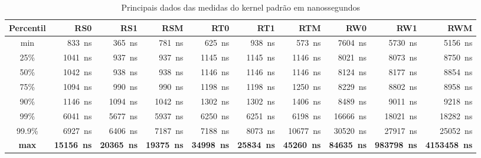 \begin{table}[!htb]
\tiny
\centering
\begin{center}
\begin{tabular}{|c|r|r|r|r|r|r|r|r|r|}
\toprule
Percentil &    RS0 &     RS1 &    RSM &    RT0 &    RT1 &    RTM &    RW0 &     RW1 &      RWM \\
\midrule
    min &    \SI{833}{ns} &    \SI{365} {ns} &   \SI{ 781}{ns} &   \SI{ 625}{ns} &   \SI{ 938}{ns} &  \SI{  573} {ns}&  \SI{ 7604} {ns}&   \SI{ 5730} {ns}&    \SI{ 5156} {ns}\\
    25\% &   \SI{1041}{ns} &   \SI{937} {ns} &   \SI{ 937}{ns} &   \SI{1145}{ns} &   \SI{1145}{ns} &  \SI{ 1146} {ns}&  \SI{ 8021} {ns}&   \SI{ 8073} {ns}&    \SI{ 8750} {ns}\\
    50\% &   \SI{1042}{ns} &   \SI{938} {ns} &   \SI{ 938}{ns} &   \SI{1146}{ns} &   \SI{1146}{ns} &  \SI{ 1146} {ns}&  \SI{ 8124} {ns}&   \SI{ 8177} {ns}&    \SI{ 8854} {ns}\\
    75\% &   \SI{1094}{ns} &   \SI{990} {ns} &   \SI{ 990}{ns} &   \SI{1198}{ns} &   \SI{1198}{ns} &  \SI{ 1250} {ns}&  \SI{ 8229} {ns}&   \SI{ 8802} {ns}&    \SI{ 8958} {ns}\\
    90\% &   \SI{1146}{ns} &   \SI{1094}{ns} &   \SI{1042}{ns} &   \SI{1302}{ns} &   \SI{1302}{ns} &  \SI{ 1406} {ns}&  \SI{ 8489} {ns}&   \SI{ 9011} {ns}&    \SI{ 9218} {ns}\\
    99\% &   \SI{6041}{ns} &   \SI{5677}{ns} &   \SI{5937}{ns} &   \SI{6250}{ns} &   \SI{6251}{ns} &  \SI{ 6198} {ns}&  \SI{16666} {ns}&   \SI{18021} {ns}&    \SI{18282} {ns}\\
  99.9\% &   \SI{6927}{ns} &   \SI{6406}{ns} &   \SI{7187}{ns} &   \SI{7188}{ns} &   \SI{8073}{ns} &  \SI{10677} {ns}&  \SI{30520} {ns}&   \SI{27917} {ns}&    \SI{25052} {ns}\\
    \textbf{max} &  \textbf{\SI{15156}{ns}} &  \textbf{\SI{20365}{ns}} &  \textbf{\SI{19375}{ns}} &  \textbf{\SI{34998}{ns}} &  \textbf{\SI{25834}{ns}} &  \textbf{\SI{45260}{ns}} &  \textbf{\SI{84635}{ns}} &  \textbf{\SI{983798}{ns}} &  \textbf{\SI{4153458}{ns}} \\
\bottomrule
\end{tabular}
\end{center}
\caption{Principais dados das medidas do kernel padrão em nanossegundos}
\label{table:rpi}
\end{table}

